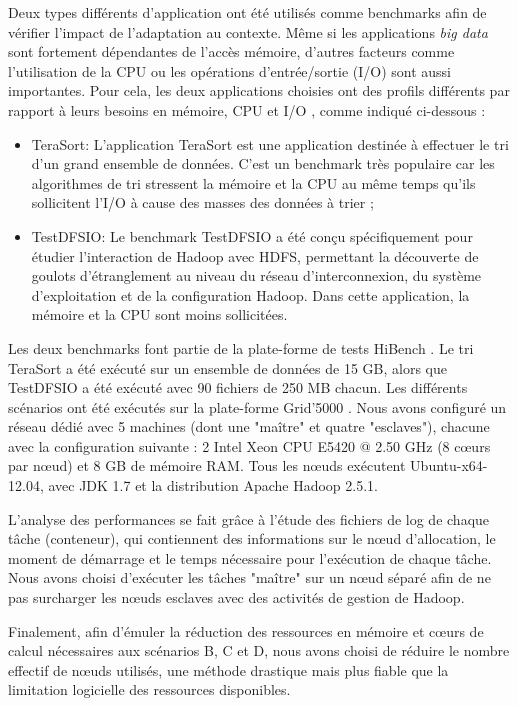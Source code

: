 Deux types différents d'application ont été utilisés comme benchmarks afin de vérifier l'impact de l'adaptation au contexte. Même si les applications \textit{big data} sont fortement dépendantes de l'accès mémoire, d'autres facteurs comme l'utilisation de la CPU ou les opérations d'entrée/sortie (I/O) sont aussi importantes. Pour cela, les deux applications choisies ont des profils différents par rapport à leurs besoins en mémoire, CPU et  I/O \cite{Benchmarks}, comme indiqué ci-dessous :
\begin{itemize}
	\item TeraSort: L'application TeraSort \cite{TeraSort2008} est une application destinée à effectuer le tri d'un grand ensemble de données. C'est un benchmark très populaire car les algorithmes de tri stressent la mémoire et la CPU au même temps qu'ils sollicitent l'I/O à cause des masses des données à trier ;
	\item TestDFSIO: Le benchmark TestDFSIO a été conçu spécifiquement pour étudier l'interaction de Hadoop avec HDFS, permettant la découverte de goulots d'étranglement au niveau du réseau d'interconnexion, du système d'exploitation et de la configuration Hadoop. Dans cette application, la mémoire et la CPU sont moins sollicitées.
\end{itemize}

Les deux benchmarks font partie de la plate-forme de tests HiBench \cite{HiBench}. Le tri TeraSort a été exécuté sur un ensemble de données de 15 GB, alors que TestDFSIO a été exécuté avec 90 fichiers de 250 MB chacun. Les différents scénarios ont été exécutés sur la plate-forme Grid'5000 \cite{g5k}. Nous avons configuré un réseau dédié avec 5 machines (dont une "maître" et quatre "esclaves"), chacune avec la configuration suivante : 2 Intel Xeon CPU E5420 @ 2.50 GHz (8 c{\oe}urs par n{\oe}ud) et 8 GB de mémoire RAM. Tous les n{\oe}uds exécutent Ubuntu-x64-12.04, avec JDK 1.7 et la distribution Apache Hadoop 2.5.1. 

L'analyse des performances se fait grâce à l'étude des fichiers de log de chaque tâche (conteneur), qui contiennent des informations sur le n{\oe}ud d'allocation, le moment de démarrage et le temps nécessaire pour l'exécution de chaque tâche. Nous avons choisi d'exécuter les tâches "maître" sur un n{\oe}ud séparé afin de ne pas surcharger les n{\oe}uds esclaves avec des activités de gestion de Hadoop. 

Finalement, afin d'émuler la réduction des ressources en mémoire et c{\oe}urs de calcul nécessaires aux scénarios B, C et D, nous avons choisi de réduire le nombre effectif de n{\oe}uds utilisés, une méthode drastique mais plus fiable que la limitation logicielle des ressources disponibles.


